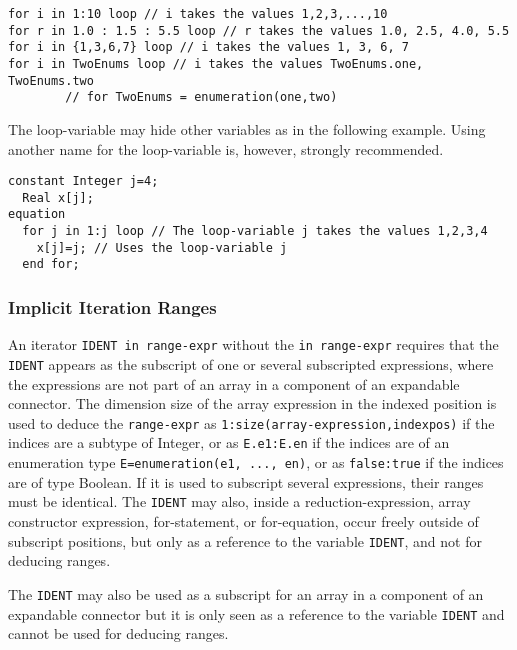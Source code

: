 \begin{example}
\begin{lstlisting}[language=modelica]
for i in 1:10 loop // i takes the values 1,2,3,...,10
for r in 1.0 : 1.5 : 5.5 loop // r takes the values 1.0, 2.5, 4.0, 5.5
for i in {1,3,6,7} loop // i takes the values 1, 3, 6, 7
for i in TwoEnums loop // i takes the values TwoEnums.one, TwoEnums.two
        // for TwoEnums = enumeration(one,two)
\end{lstlisting}
The loop-variable may hide other variables as in the following
example. Using another name for the loop-variable is, however, strongly
recommended.
\begin{lstlisting}[language=modelica]
  constant Integer j=4;
  Real x[j];
equation
  for j in 1:j loop // The loop-variable j takes the values 1,2,3,4
    x[j]=j; // Uses the loop-variable j
  end for;
\end{lstlisting}
\end{example}

\subsubsection{Implicit Iteration Ranges}\label{implicit-iteration-ranges}

An iterator \lstinline!IDENT in range-expr! without the \lstinline!in range-expr! requires that
the \lstinline!IDENT! appears as the subscript of one or several subscripted
expressions, where the expressions are not part of an array in a component of an expandable connector.
The dimension size of the array expression in the indexed
position is used to deduce the \lstinline!range-expr! as
\lstinline!1:size(array-expression,indexpos)! if the indices are a subtype of
Integer, or as \lstinline!E.e1:E.en! if the indices are of an enumeration type
\lstinline!E=enumeration(e1, ..., en)!, or as \lstinline!false:true! if the indices are of
type Boolean. If it is used to subscript several expressions, their
ranges must be identical. The \lstinline!IDENT! may also, inside a
reduction-expression, array constructor expression, for-statement, or
for-equation, occur freely outside of subscript positions, but only as a
reference to the variable \lstinline!IDENT!, and not for deducing ranges.

The \lstinline!IDENT! may also be used as a subscript for an array in a component of an expandable connector
but it is only seen as a reference to the variable \lstinline!IDENT! and cannot be used for deducing ranges.

